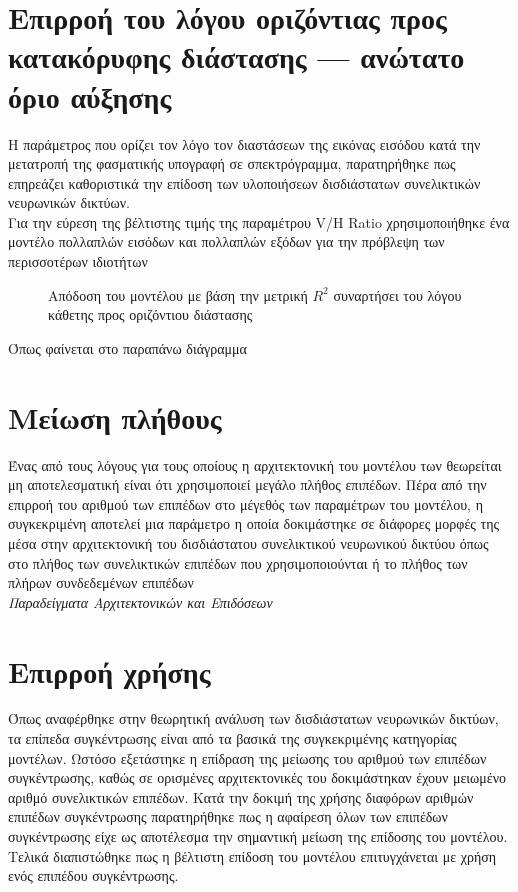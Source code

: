 \section{Επιρροή του λόγου οριζόντιας προς κατακόρυφης διάστασης --- ανώτατο όριο αύξησης}
Η παράμετρος που ορίζει τον λόγο τον διαστάσεων της εικόνας εισόδου κατά την μετατροπή της φασματικής υπογραφή σε σπεκτρόγραμμα, παρατηρήθηκε πως επηρεάζει καθοριστικά την επίδοση των υλοποιήσεων δισδιάστατων συνελικτικών νευρωνικών δικτύων.\\
Για την εύρεση της βέλτιστης τιμής της παραμέτρου V/H Ratio χρησιμοποιήθηκε ένα μοντέλο πολλαπλών εισόδων και πολλαπλών εξόδων για την πρόβλεψη των περισσοτέρων ιδιοτήτων

\begin{figure}[H]
  \begin{center}
    
    \caption{Απόδοση του μοντέλου με βάση την μετρική $R^2$ συναρτήσει του λόγου κάθετης προς οριζόντιου διάστασης}
  \end{center}
\end{figure}

Όπως φαίνεται στο παραπάνω διάγραμμα

\section{Μείωση πλήθους }
Ένας από τους λόγους για τους οποίους η αρχιτεκτονική του μοντέλου των  θεωρείται μη αποτελεσματική είναι ότι χρησιμοποιεί μεγάλο πλήθος επιπέδων. Πέρα από την επιρροή του αριθμού των επιπέδων στο μέγεθός των παραμέτρων του μοντέλου, η συγκεκριμένη αποτελεί μια παράμετρο η οποία δοκιμάστηκε σε διάφορες μορφές της μέσα στην αρχιτεκτονική του δισδιάστατου συνελικτικού νευρωνικού δικτύου όπως στο πλήθος των συνελικτικών επιπέδων που χρησιμοποιούνται ή το πλήθος των πλήρων συνδεδεμένων επιπέδων\\

\textit{Παραδείγματα Αρχιτεκτονικών και Επιδόσεων}\\



\section{Επιρροή χρήσης }
Όπως αναφέρθηκε στην θεωρητική ανάλυση των δισδιάστατων νευρωνικών δικτύων, τα επίπεδα συγκέντρωσης είναι από τα βασικά της συγκεκριμένης κατηγορίας μοντέλων. Ωστόσο εξετάστηκε η επίδραση της μείωσης του αριθμού των επιπέδων συγκέντρωσης, καθώς σε ορισμένες αρχιτεκτονικές του δοκιμάστηκαν έχουν μειωμένο αριθμό συνελικτικών επιπέδων. Κατά την δοκιμή της χρήσης διαφόρων αριθμών επιπέδων συγκέντρωσης παρατηρήθηκε πως η αφαίρεση όλων των επιπέδων συγκέντρωσης είχε ως αποτέλεσμα την σημαντική μείωση της επίδοσης του μοντέλου. Τελικά διαπιστώθηκε πως η βέλτιστη επίδοση του μοντέλου επιτυγχάνεται με χρήση ενός επιπέδου συγκέντρωσης.

